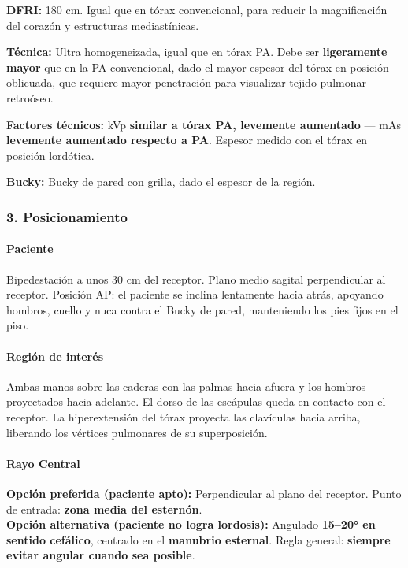 		\textbf{DFRI:} 180 cm. Igual que en tórax convencional, para reducir la magnificación del corazón y estructuras mediastínicas.
		
		\textbf{Técnica:} Ultra homogeneizada, igual que en tórax PA. Debe ser \textbf{ligeramente mayor} que en la PA convencional, dado el mayor espesor del tórax en posición oblicuada, que requiere mayor penetración para visualizar tejido pulmonar retroóseo.
		
		\textbf{Factores técnicos:} kVp \textbf{similar a tórax PA, levemente aumentado} --- mAs \textbf{levemente aumentado respecto a PA}. Espesor medido con el tórax en posición lordótica.
		
		\textbf{Bucky:} Bucky de pared con grilla, dado el espesor de la región.
		
		\subsubsection*{3. Posicionamiento}
		
		\paragraph{Paciente}
		Bipedestación a unos 30 cm del receptor. Plano medio sagital perpendicular al receptor. Posición AP: el paciente se inclina lentamente hacia atrás, apoyando hombros, cuello y nuca contra el Bucky de pared, manteniendo los pies fijos en el piso.
		
		\paragraph{Región de interés}
		Ambas manos sobre las caderas con las palmas hacia afuera y los hombros proyectados hacia adelante. El dorso de las escápulas queda en contacto con el receptor. La hiperextensión del tórax proyecta las clavículas hacia arriba, liberando los vértices pulmonares de su superposición.
		
		\paragraph{Rayo Central}
		\textbf{Opción preferida (paciente apto):} Perpendicular al plano del receptor. Punto de entrada: \textbf{zona media del esternón}.\\
		\textbf{Opción alternativa (paciente no logra lordosis):} Angulado \textbf{15--20° en sentido cefálico}, centrado en el \textbf{manubrio esternal}. Regla general: \textbf{siempre evitar angular cuando sea posible}.
		
